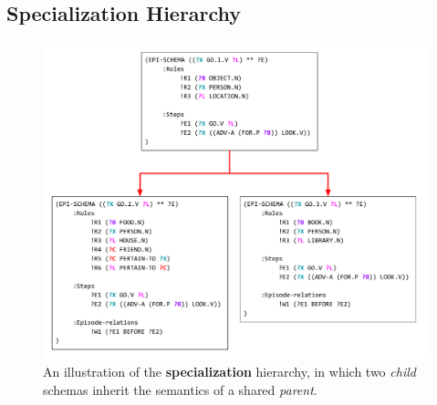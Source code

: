 \subsection{Specialization Hierarchy}
\begin{figure}
    \centering
    \includegraphics[width=\columnwidth]{CH3_schemas/inheritance}
    \caption{An illustration of the \textbf{specialization} hierarchy, in which two \textit{child} schemas inherit the semantics of a shared \textit{parent}.}
    \label{fig:spec_hier}
\end{figure}